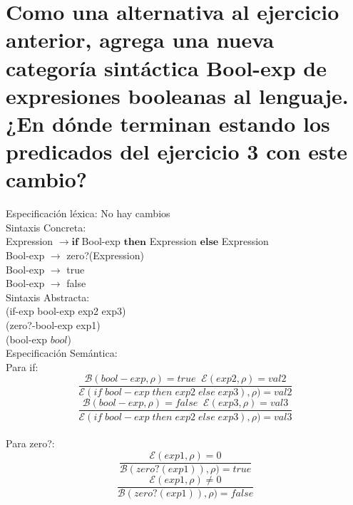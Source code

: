 \documentclass{article}
\begin{document}
\section{Como una alternativa al ejercicio anterior, agrega una nueva categoría sintáctica Bool-exp
de expresiones booleanas al lenguaje. ¿En dónde terminan estando los predicados del ejercicio 3 con
este cambio?}
Especificación léxica:
No hay cambios
\\
Sintaxis Concreta:
\\
Expression $\rightarrow \boldsymbol{if}$ Bool-exp $\boldsymbol{then}$ Expression $\boldsymbol{else}$ Expression
\\
Bool-exp $\rightarrow$ zero?(Expression)
\\
Bool-exp $\rightarrow$ true
\\
Bool-exp $\rightarrow$ false
\\
Sintaxis Abstracta:
\\
(if-exp bool-exp exp2 exp3)
\\
(zero?-bool-exp exp1)
\\
(bool-exp $bool$)
\\
Especificación Semántica:
\\
Para if:
$$\frac{\mathcal{B} (bool-exp,\rho) = true \;\; \mathcal{E}(exp2,\rho)= val2}{\mathcal{E} (if\; bool-exp\; then \; exp2 \; else \; exp3), \rho) = val2}$$
$$\frac{\mathcal{B} (bool-exp,\rho) = false \;\; \mathcal{E}(exp3,\rho)= val3}{\mathcal{E} (if\; bool-exp\; then \; exp2 \; else \; exp3), \rho) = val3}$$
\\
Para zero?:
$$\frac{\mathcal{E} (exp1,\rho) = 0}{\mathcal{B} (zero?(exp1)), \rho) = true}$$
$$\frac{\mathcal{E} (exp1,\rho) \neq 0}{\mathcal{B} (zero?(exp1)), \rho) = false}$$
\\
\end{document}
